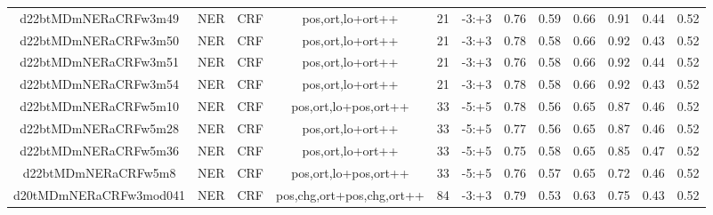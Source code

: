 \documentclass[a4paper]{article}
\begin{document}
\begin{landscape}
\begin{center}
\begin{tabular}{ |c|c|c|c|c|c|c|c|c|c|c|c|}
 
 	
 	\small{ d22btMDmNERaCRFw3m49 } & \small{ NER} & \small{  CRF }  & pos,ort,lo+ort++  &  21 &  \small{  -3:+3 }  &  0.76 & 0.59 & 0.66  &  0.91 & 0.44 & 0.52 \\
 	

 
 	
 	\small{ d22btMDmNERaCRFw3m50 } & \small{ NER} & \small{  CRF }  & pos,ort,lo+ort++  &  21 &  \small{  -3:+3 }  &  0.78 & 0.58 & 0.66  &  0.92 & 0.43 & 0.52 \\
 	

 
 	
 	\small{ d22btMDmNERaCRFw3m51 } & \small{ NER} & \small{  CRF }  & pos,ort,lo+ort++  &  21 &  \small{  -3:+3 }  &  0.76 & 0.58 & 0.66  &  0.92 & 0.44 & 0.52 \\
 	

 
 	
 	\small{ d22btMDmNERaCRFw3m54 } & \small{ NER} & \small{  CRF }  & pos,ort,lo+ort++  &  21 &  \small{  -3:+3 }  &  0.78 & 0.58 & 0.66  &  0.92 & 0.43 & 0.52 \\
 	

 
 	
 	\small{ d22btMDmNERaCRFw5m10 } & \small{ NER} & \small{  CRF }  & pos,ort,lo+pos,ort++  &  33 &  \small{  -5:+5 }  &  0.78 & 0.56 & 0.65  &  0.87 & 0.46 & 0.52 \\
 	

 
 	
 	\small{ d22btMDmNERaCRFw5m28 } & \small{ NER} & \small{  CRF }  & pos,ort,lo+ort++  &  33 &  \small{  -5:+5 }  &  0.77 & 0.56 & 0.65  &  0.87 & 0.46 & 0.52 \\
 	

 
 	
 	\small{ d22btMDmNERaCRFw5m36 } & \small{ NER} & \small{  CRF }  & pos,ort,lo+ort++  &  33 &  \small{  -5:+5 }  &  0.75 & 0.58 & 0.65  &  0.85 & 0.47 & 0.52 \\
 	

 
 	
 	\small{ d22btMDmNERaCRFw5m8 } & \small{ NER} & \small{  CRF }  & pos,ort,lo+pos,ort++  &  33 &  \small{  -5:+5 }  &  0.76 & 0.57 & 0.65  &  0.72 & 0.46 & 0.52 \\
 	

 
 	
 	\small{ d20tMDmNERaCRFw3mod041 } & \small{ NER} & \small{  CRF }  & pos,chg,ort+pos,chg,ort++  &  84 &  \small{  -3:+3 }  &  0.79 & 0.53 & 0.63  &  0.75 & 0.43 & 0.52 \\
 	


\end{tabular}
\end{center}
\end{landscape}
\end{document}
